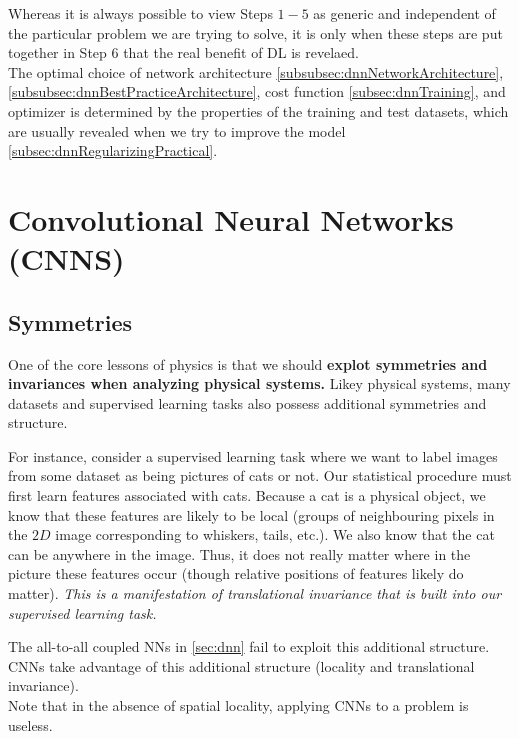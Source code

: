 Whereas it is always possible to view Steps $1-5$ as generic and independent of the particular problem we are trying to solve, it is only when these steps are put together in Step $6$ that the real benefit of DL is revelaed.\\
The optimal choice of network architecture \ref{subsubsec:dnnNetworkArchitecture},\ref{subsubsec:dnnBestPracticeArchitecture}, cost function \ref{subsec:dnnTraining}, and optimizer is determined by the properties of the training and test datasets, which are usually revealed when we try to improve the model \ref{subsec:dnnRegularizingPractical}.



\section{Convolutional Neural Networks (CNNS)}
\label{sec:cnn}
\subsection{Symmetries}
\label{subsec:cnnSymmetries}
One of the core lessons of physics is that we should \textbf{explot symmetries and invariances when analyzing physical systems.} Likey physical systems, many datasets and supervised learning tasks also possess additional symmetries and structure. 
\begin{example}
For instance, consider a supervised learning task where we want to label images from some dataset as being pictures of cats or not. Our statistical procedure must first learn features associated with cats. Because a cat is a physical object, we know that these features are likely to be local (groups of neighbouring pixels in the $2D$ image corresponding to whiskers, tails, etc.). We also know that the cat can be anywhere in the image. Thus, it does not really matter where in the picture these features occur (though relative positions of features likely do matter). \emph{This is a manifestation of translational invariance that is built into our supervised learning task.}
\end{example}
The all-to-all coupled NNs in \ref{sec:dnn} fail to exploit this additional structure. CNNs take advantage of this additional structure (locality and translational invariance). 
\\
Note that in the absence of spatial locality, applying CNNs to a problem is useless.








